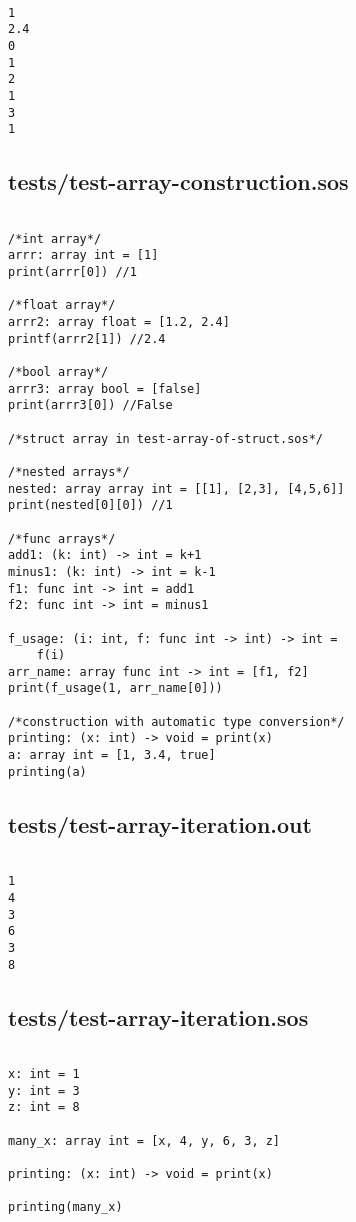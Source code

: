 \documentclass[main.tex]{subfiles}
\begin{document}
\begin{lstlisting}

1
2.4
0
1
2
1
3
1
\end{lstlisting}

\subsection{tests/test-array-construction.sos}

\begin{lstlisting}

/*int array*/
arrr: array int = [1]
print(arrr[0]) //1

/*float array*/
arrr2: array float = [1.2, 2.4]
printf(arrr2[1]) //2.4

/*bool array*/
arrr3: array bool = [false]
print(arrr3[0]) //False

/*struct array in test-array-of-struct.sos*/

/*nested arrays*/
nested: array array int = [[1], [2,3], [4,5,6]]
print(nested[0][0]) //1

/*func arrays*/
add1: (k: int) -> int = k+1
minus1: (k: int) -> int = k-1
f1: func int -> int = add1
f2: func int -> int = minus1

f_usage: (i: int, f: func int -> int) -> int =
    f(i)
arr_name: array func int -> int = [f1, f2]
print(f_usage(1, arr_name[0]))

/*construction with automatic type conversion*/
printing: (x: int) -> void = print(x)
a: array int = [1, 3.4, true]
printing(a)
\end{lstlisting}

\subsection{tests/test-array-iteration.out}

\begin{lstlisting}

1
4
3
6
3
8\end{lstlisting}

\subsection{tests/test-array-iteration.sos}

\begin{lstlisting}

x: int = 1
y: int = 3
z: int = 8

many_x: array int = [x, 4, y, 6, 3, z]

printing: (x: int) -> void = print(x)

printing(many_x)
\end{lstlisting}
\end{document}

